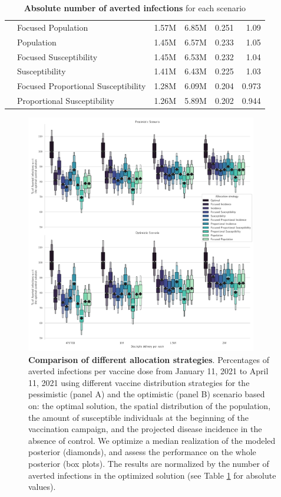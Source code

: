 \begin{table}[h!]
\begin{tabular}{llrrrr}
        & Focused Population &   1.57M &    6.85M &          0.251 &        1.09 \\
        & Population &   1.45M &    6.57M &          0.233 &        1.05 \\
        & Focused Susceptibility &   1.45M &    6.53M &          0.232 &        1.04 \\
        & Susceptibility &   1.41M &    6.43M &          0.225 &        1.03 \\
        & Focused Proportional Susceptibility &   1.28M &    6.09M &          0.204 &       0.973 \\
        & Proportional Susceptibility &   1.26M &    5.89M &          0.202 &       0.944 \\
\bottomrule
\end{tabular}
\caption{\footnotesize{\textbf{Absolute number of averted infections} for each scenario}}
\label{table:all_strat}
\end{table}

\begin{figure}[!ht]
    \centering
    \includegraphics[width=0.9\textwidth]{fig_italy-ocp/figuresSI/scenarios_perturb_all_SI.pdf}
    \caption[Comparison of different allocation strategies]{\textbf{Comparison of different allocation strategies}. Percentages of averted infections per vaccine dose from January 11, 2021 to April 11, 2021 using different vaccine distribution strategies for the pessimistic (panel A) and the optimistic (panel B) scenario based on: the optimal solution, the spatial distribution of the population, the amount of susceptible individuals at the beginning of the vaccination campaign, and the projected disease incidence in the absence of control. We optimize a median realization of the modeled posterior (diamonds), and assess the performance on the whole posterior (box plots). The results are normalized by the number of averted infections in the optimized solution (see Table \ref{table:all_strat} for absolute values).}
    \label{fig:OC_comparison_all}
\end{figure}


